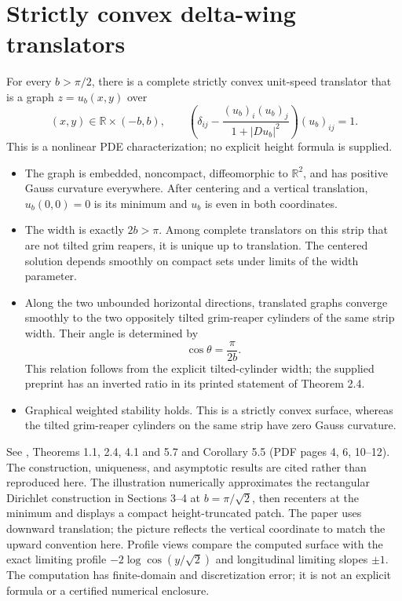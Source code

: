\chapter{Strictly convex delta-wing translators}\label{sec:catalogue-delta-wing}
\begin{example}\label{ex:catalogue-delta-wing}
For every $b>\pi/2$, there is a complete strictly convex unit-speed translator that is a graph $z=u_b(x,y)$ over
\[
 (x,y)\in\mathbb R\times(-b,b),\qquad
 \left(\delta_{ij}-\frac{(u_b)_i(u_b)_j}{1+|Du_b|^2}\right)(u_b)_{ij}=1.
\]
This is a nonlinear PDE characterization; no explicit height formula is supplied.
\begin{itemize}
\item The graph is embedded, noncompact, diffeomorphic to $\mathbb R^2$, and has positive Gauss curvature everywhere. After centering and a vertical translation, $u_b(0,0)=0$ is its minimum and $u_b$ is even in both coordinates.
\item The width is exactly $2b>\pi$. Among complete translators on this strip that are not tilted grim reapers, it is unique up to translation. The centered solution depends smoothly on compact sets under limits of the width parameter.
\item Along the two unbounded horizontal directions, translated graphs converge smoothly to the two oppositely tilted grim-reaper cylinders of the same strip width. Their angle is determined by
\[
 \cos\theta=\frac{\pi}{2b}.
\]
This relation follows from the explicit tilted-cylinder width; the supplied preprint has an inverted ratio in its printed statement of Theorem 2.4.
\item Graphical weighted stability holds. This is a strictly convex surface, whereas the tilted grim-reaper cylinders on the same strip have zero Gauss curvature.
\end{itemize}
See \cite{CatHIMWGraphical18}, Theorems 1.1, 2.4, 4.1 and 5.7 and Corollary 5.5 (PDF pages 4, 6, 10--12). The construction, uniqueness, and asymptotic results are cited rather than reproduced here. The illustration numerically approximates the rectangular Dirichlet construction in Sections 3--4 at $b=\pi/\sqrt{2}$, then recenters at the minimum and displays a compact height-truncated patch. The paper uses downward translation; the picture reflects the vertical coordinate to match the upward convention here. Profile views compare the computed surface with the exact limiting profile $-2\log\cos(y/\sqrt{2})$ and longitudinal limiting slopes $\pm1$. The computation has finite-domain and discretization error; it is not an explicit formula or a certified numerical enclosure.
\end{example}


